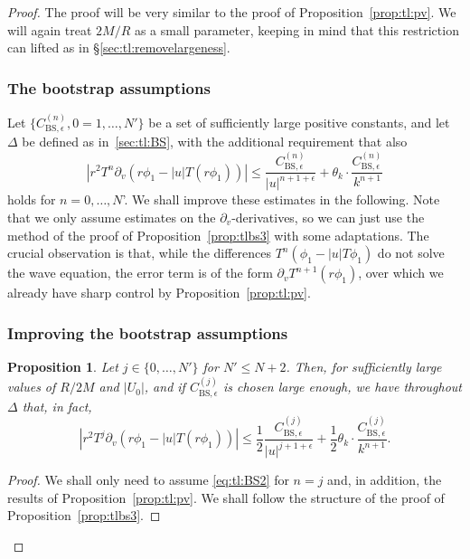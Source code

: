 \documentclass[11pt,english]{article}
\numberwithin{equation}{section}
\theoremstyle{remark}
\theoremstyle{plain}
\newtheorem{prop}{Proposition}[section]
\theoremstyle{remark}
\newcommand{\pv}{\partial_v}
\renewcommand{\(}{\left(}
\renewcommand{\)}{\right)}
\begin{document}
\begin{proof}The proof will be very similar to the proof of Proposition~\ref{prop:tl:pv}. We will again treat $2M/R$ as a small parameter, keeping in mind that this restriction can lifted as in \S \ref{sec:tl:removelargeness}.

\subsubsection{The bootstrap assumptions}
\newcommand{\cbse}{C_{\mathrm{BS},\epsilon}}
Let $\{\cbse^{(n)},0=1,\dots,N'\}$ be a set of sufficiently large positive constants, and let $\Delta$ be defined as in~\ref{sec:tl:BS}, with the additional requirement that also 
\begin{equation}\label{eq:tl:BS2}
\tag{BS''(n)}
\left|r^2T^n\pv\left(r\phi_1-|u|T(r\phi_1)\right)\right|\leq \frac{\cbse^{(n)}}{|u|^{n+1+\epsilon}}+\theta_k\cdot \frac{\cbse^{(n)}}{k^{n+1}}
\end{equation}
holds for $n=0,\dots,N$'.
We shall improve these estimates in the following. Note that we only assume estimates on the $\pv$-derivatives, so we can just use the method of the proof of Proposition~\ref{prop:tlbs3} with some adaptations. The crucial observation is that, while the differences $T^n(\phi_1-|u|T\phi_1)$ do not solve the wave equation, the error term is of the form $\pv T^{n+1}(r\phi_1)$, over which we already have sharp control by Proposition~\ref{prop:tl:pv}.
\subsubsection{Improving the bootstrap assumptions}
\begin{prop}
Let $j\in\{0,\dots,N'\}$ for $N'\leq N+2$. Then, for sufficiently large values of $R/2M$ and $|U_0|$, and if $\cbse^{(j)}$ is chosen large enough, we have throughout $\Delta$ that, in fact,
\begin{equation}
\left|r^2T^j\pv\left(r\phi_1-|u|T(r\phi_1)\right)\right|\leq \frac12\frac{\cbse^{(j)}}{|u|^{j+1+\epsilon}}+\frac12 \theta_k\cdot \frac{\cbse^{(j)}}{k^{n+1}}.
\end{equation}
\end{prop}
\begin{proof}
We shall only need to assume \eqref{eq:tl:BS2} for $n=j$ and, in addition, the results of Proposition~\ref{prop:tl:pv}. We shall follow the structure of the proof of Proposition~\ref{prop:tlbs3}.


\end{proof}
\end{proof}
\end{document}
